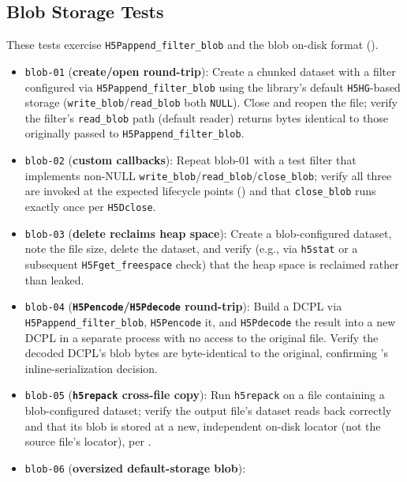 \documentclass[../RFC-HDFG-2026-003.tex]{subfiles}
\begin{document}
\subsection{Blob Storage Tests}
\label{sec:test-blob}

These tests exercise \texttt{H5Pappend\_filter\_blob} and the blob
on-disk format ().

\begin{itemize}
\item \texttt{blob-01} (\textbf{create/open round-trip}): Create a
  chunked dataset with a filter configured via
  \texttt{H5Pappend\_filter\_blob} using the library's default
  \texttt{H5HG}-based storage (\texttt{write\_blob}/\texttt{read\_blob}
  both \texttt{NULL}). Close and reopen the file; verify the filter's
  \texttt{read\_blob} path (default reader) returns bytes identical to
  those originally passed to \texttt{H5Pappend\_filter\_blob}.
\item \texttt{blob-02} (\textbf{custom callbacks}): Repeat blob-01 with
  a test filter that implements non-NULL
  \texttt{write\_blob}/\texttt{read\_blob}/\texttt{close\_blob}; verify
  all three are invoked at the expected lifecycle points
  () and that \texttt{close\_blob} runs
  exactly once per \texttt{H5Dclose}.
\item \texttt{blob-03} (\textbf{delete reclaims heap space}): Create a
  blob-configured dataset, note the file size, delete the dataset, and
  verify (e.g., via \texttt{h5stat} or a subsequent
  \texttt{H5Fget\_freespace} check) that the heap space is reclaimed
  rather than leaked.
\item \texttt{blob-04} (\textbf{\texttt{H5Pencode}/\texttt{H5Pdecode}
  round-trip}): Build a DCPL via \texttt{H5Pappend\_filter\_blob},
  \texttt{H5Pencode} it, and \texttt{H5Pdecode} the result into a new
  DCPL in a separate process with no access to the original file. Verify
  the decoded DCPL's blob bytes are byte-identical to the original,
  confirming 's inline-serialization
  decision.
\item \texttt{blob-05} (\textbf{\texttt{h5repack} cross-file copy}): Run
  \texttt{h5repack} on a file containing a blob-configured dataset;
  verify the output file's dataset reads back correctly and that its
  blob is stored at a new, independent on-disk locator (not the source
  file's locator), per .
\item \texttt{blob-06} (\textbf{oversized default-storage blob}):

\end{itemize}
\end{document}
